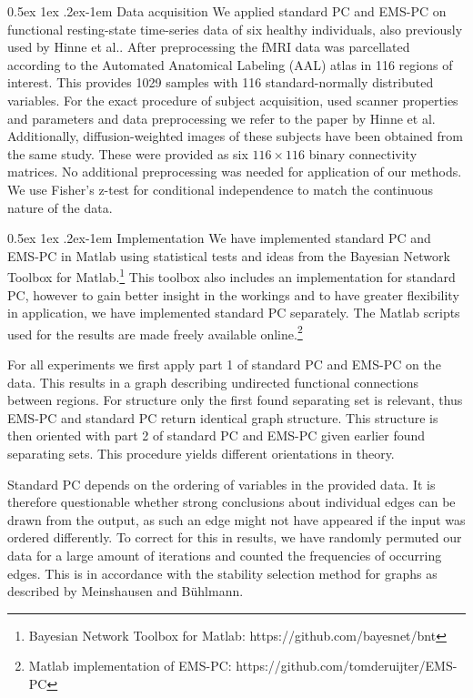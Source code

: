 \documentclass[a4paper, english]{article}
\makeatletter
\renewcommand{\paragraph}{%
  \@startsection{paragraph}{4}%
  {\z@}{0.5ex \@plus 1ex \@minus .2ex}{-1em}%
  {\normalfont\normalsize\bfseries}%
}
\makeatother
\begin{document}
\paragraph{Data acquisition}
We applied standard PC and EMS-PC on functional resting-state time-series data of six healthy individuals, also previously used by Hinne et al.\cite{hinne2013}.
After preprocessing the fMRI data was parcellated according to the Automated Anatomical Labeling (AAL) atlas in 116 regions of interest.
This provides 1029 samples with 116 standard-normally distributed variables.
For the exact procedure of subject acquisition, used scanner properties and parameters and data preprocessing we refer to the paper by Hinne et al. 
Additionally, diffusion-weighted images of these subjects have been obtained from the same study.
These were provided as six $116 \times 116$ binary connectivity matrices.
No additional preprocessing was needed for application of our methods.
We use Fisher's z-test for conditional independence to match the continuous nature of the data.

\paragraph{Implementation}
We have implemented standard PC and EMS-PC in Matlab using statistical tests and ideas from the Bayesian Network Toolbox for Matlab.\footnote{Bayesian Network Toolbox for Matlab: https://github.com/bayesnet/bnt}
This toolbox also includes an implementation for standard PC, however to gain better insight in the workings and to have greater flexibility in application, we have implemented standard PC separately.
The Matlab scripts used for the results are made freely available online.\footnote{Matlab implementation of EMS-PC: https://github.com/tomderuijter/EMS-PC}

For all experiments we first apply part 1 of standard PC and EMS-PC on the data.
This results in a graph describing undirected functional connections between regions.
For structure only the first found separating set is relevant, thus EMS-PC and standard PC return identical graph structure.
This structure is then oriented with part 2 of standard PC and EMS-PC given earlier found separating sets.
This procedure yields different orientations in theory.

Standard PC depends on the ordering of variables in the provided data\cite[p.120-122]{spirtes2000}.
It is therefore questionable whether strong conclusions about individual edges can be drawn from the output, as such an edge might not have appeared if the input was ordered differently.
To correct for this in results, we have randomly permuted our data for a large amount of iterations and counted the frequencies of occurring edges.
This is in accordance with the stability selection method for graphs as described by Meinshausen and B{\"u}hlmann\cite{meinshausen2010}.
\end{document}
